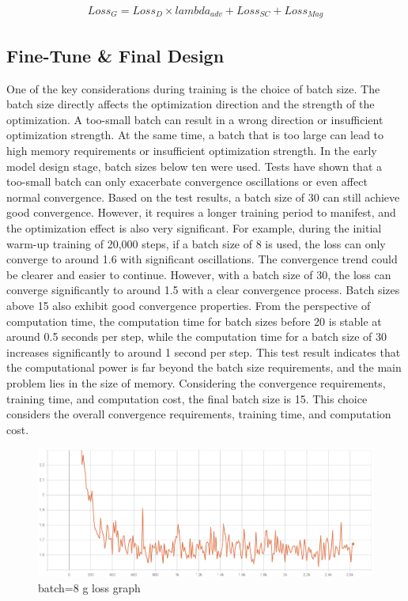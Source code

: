\documentclass[10pt,journal,compsoc]{IEEEtran}
\begin{document}
\begin{align}
    Loss_G = Loss_D \times lambda_{adv} + Loss_{SC} + Loss_{Mag}
\end{align}

\subsection{Fine-Tune \& Final Design}

One of the key considerations during training is the choice of batch size. The batch size directly affects the optimization direction and the strength of the optimization. A too-small batch can result in a wrong direction or insufficient optimization strength. At the same time, a batch that is too large can lead to high memory requirements or insufficient optimization strength. In the early model design stage, batch sizes below ten were used. Tests have shown that a too-small batch can only exacerbate convergence oscillations or even affect normal convergence. Based on the test results, a batch size of 30 can still achieve good convergence. However, it requires a longer training period to manifest, and the optimization effect is also very significant. For example, during the initial warm-up training of 20,000 steps, if a batch size of 8 is used, the loss can only converge to around 1.6 with significant oscillations. The convergence trend could be clearer and easier to continue. However, with a batch size of 30, the loss can converge significantly to around 1.5 with a clear convergence process. Batch sizes above 15 also exhibit good convergence properties. From the perspective of computation time, the computation time for batch sizes before 20 is stable at around 0.5 seconds per step, while the computation time for a batch size of 30 increases significantly to around 1 second per step. This test result indicates that the computational power is far beyond the batch size requirements, and the main problem lies in the size of memory. Considering the convergence requirements, training time, and computation cost, the final batch size is 15. This choice considers the overall convergence requirements, training time, and computation cost.

\begin{figure}
    \centering
    \includegraphics[scale=0.6] {PNG/3-5.png}
    \caption{batch=8 g loss graph}
    \label{fig:3-5}
\end{figure}
\end{document}
